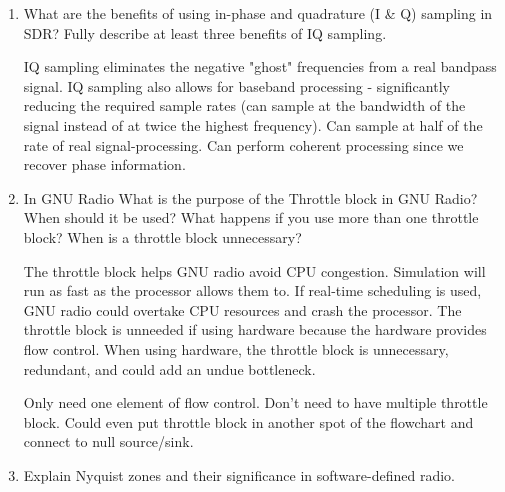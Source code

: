 \documentclass{article}
\begin{document}
\begin{enumerate}
	\item What are the benefits of using in-phase and quadrature (I \& Q) sampling in SDR? Fully describe at least three benefits of IQ sampling.
	
	IQ sampling eliminates the negative "ghost" frequencies from a real bandpass signal. IQ sampling also allows for baseband processing - significantly reducing the required sample rates (can sample at the bandwidth of the signal instead of at twice the highest frequency). Can sample at half of the rate of real signal-processing. Can perform coherent processing since we recover phase information.
	
	\item In GNU Radio What is the purpose of the Throttle block in GNU Radio? When should it be used? What happens if you use more than one throttle block? When is a throttle block unnecessary?

		The throttle block helps GNU radio avoid CPU congestion. Simulation will run as fast as the processor allows them to. If real-time scheduling is used, GNU radio could overtake CPU resources and crash the processor. The throttle block is unneeded if using hardware because the hardware provides flow control. When using hardware, the throttle block is unnecessary, redundant, and could add an undue bottleneck.
		
		Only need one element of flow control. Don't need to have multiple throttle block. Could even put throttle block in another spot of the flowchart and connect to null source/sink.
		
	\item  Explain Nyquist zones and their significance in software-defined radio.
	

\end{enumerate}
\end{document}
